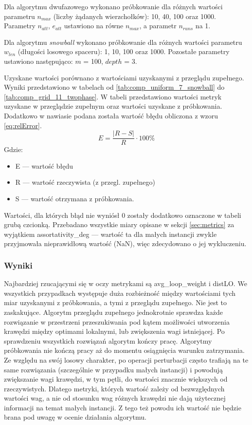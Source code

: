 Dla algorytmu dwufazowego wykonano próbkowanie dla różnych wartości parametru $n_{max}$ (liczby żądanych wierzchołków): 10, 40, 100 oraz 1000.
Parametry $n_{att}$, $e_{att}$ ustawiono na równe $n_{max}$, a parametr $n_{runs}$ na 1.

Dla algorytmu \textit{snowball} wykonano próbkowanie dla różnych wartości parametru $w_{len}$ (długości losowego spaceru): 1, 10, 100 oraz 1000.
Pozostałe parametry ustawiono następująco: $m$ = 100, $depth$ = 3.

Uzyskane wartości porównano z wartościami uzyskanymi z przeglądu zupełnego.
Wyniki przedstawiono w tabelach od \ref{tab:comp_uniform_7_snowball} do \ref{tab:comp_grid_11_twophase}.
W tabeli przedstawiono wartości metryk uzyskane w przeglądzie zupełnym oraz wartości uzyskane z próbkowania.
Dodatkowo w nawiasie podana została wartość błędu obliczona z wzoru \ref{eq:relError}.
\begin{equation}
    \label{eq:relError}
    E = \frac{|R - S|}{R} \cdot 100\%
\end{equation}
Gdzie:
\begin{itemize}
    \item E --- wartość błędu
    \item R --- wartość rzeczywista (z przegl. zupełnego)
    \item S --- wartość otrzymana z próbkowania.
\end{itemize}

Wartości, dla których błąd nie wyniósł 0 zostały dodatkowo oznaczone w tabeli grubą czcionką.
Przebadano wszystkie miary opisane w sekcji \ref{sec:metrics} za wyjątkiem assortativity\_deg --- wartość ta dla małych instancji zwykle przyjmowała
nieprawidłową wartość (NaN), więc zdecydowano o jej wykluczeniu.

\subsubsection{Wyniki}



Najbardziej rzucającymi się w oczy metrykami są avg\_loop\_weight i distLO.
We wszystkich przypadkach występuje duża rozbieżność między wartościami tych miar uzyskanymi z próbkowania, a tymi z przeglądu zupełnego.
Nie jest to zaskakujące. Algorytm przeglądu zupełnego jednokrotnie sprawdza każde rozwiązanie w przestrzeni przeszukiwania pod kątem
możliwości utworzenia krawędzi między optimami lokalnymi, lub zwiększenia wagi istniejącej.
Po sprawdzeniu wszystkich rozwiązań algorytm kończy pracę.
Algorytmy próbkowania nie kończą pracy aż do momentu osiągnięcia warunku zatrzymania.
Ze względu na swój losowy charakter, po operacji perturbacji często trafiają na te same rozwiązania
(szczególnie w przypadku małych instancji) i powodują zwiększanie wagi krawędzi, w tym pętli, do wartości znacznie większych od rzeczywistych.
Dlatego metryki, których wartość zależy od bezwzględnych wartości wag, a nie od stosunku wag różnych krawędzi nie dają użytecznej informacji na temat małych instancji.
Z tego też powodu ich wartość nie będzie brana pod uwagę w ocenie działania algorytmu.

